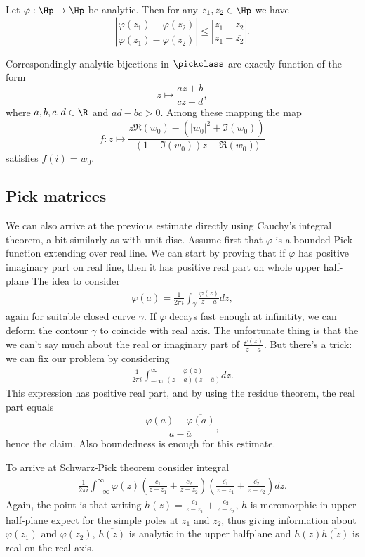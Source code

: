 \begin{lause}
	Let $\varphi : \Hp \to \Hp$ be analytic. Then for any $z_{1}, z_{2} \in \Hp$ we have
	\[
		\left|\frac{\varphi(z_{1}) - \varphi(z_{2})}{\varphi(z_{1}) - \overline{\varphi(z_{2})}} \right| \leq \left|\frac{z_{1} - z_{2}}{z_{1} - \overline{z_{2}}} \right|.
	\]
\end{lause}

Correspondingly analytic bijections in $\pickclass$ are exactly function of the form
\[
	z \mapsto \frac{a z + b}{c z + d},
\]
where $a, b, c, d \in \R$ and $a d - b c > 0$. Among these mapping the map
\[
	f : z \mapsto \frac{z \Re(w_{0}) - (|w_{0}|^2 + \Im(w_{0}))}{(1 + \Im(w_{0})) z - \Re(w_{0}))}
\]
satisfies $f(i) = w_{0}$.

\subsection{Pick matrices}

We can also arrive at the previous estimate directly using Cauchy's integral theorem, a bit similarly as with unit disc. Assume first that $\varphi$ is a bounded Pick-function extending over real line. We can start by proving that if $\varphi$ has positive imaginary part on real line, then it has positive real part on whole upper half-plane The idea to consider
\begin{align*}
	\varphi(a) = \frac{1}{2 \pi i}\int_{\gamma} \frac{\varphi(z)}{z - a} dz,
\end{align*}
again for suitable closed curve $\gamma$. If $\varphi$ decays fast enough at infinitity, we can deform the contour $\gamma$ to coincide with real axis. The unfortunate thing is that the we can't say much about the real or imaginary part of $ \frac{\varphi(z)}{z - a}$. But there's a trick: we can fix our problem by considering
\begin{align*}
	\frac{1}{2 \pi i}\int_{-\infty}^{\infty} \frac{\varphi(z)}{(z - a) (z - \overline{a})} dz.
\end{align*}
This expression has positive real part, and by using the residue theorem, the real part equals
\[
	\frac{\varphi(a) - \overline{\varphi(a)}}{a - \overline{a}},
\]
hence the claim. Also boundedness is enough for this estimate.

To arrive at Schwarz-Pick theorem consider integral
\begin{align*}
	\frac{1}{2 \pi i}\int_{-\infty}^{\infty} \varphi(z) \left(\frac{c_{1}}{z - z_{1}} + \frac{c_{2}}{z - z_{2}} \right) \left(\frac{\overline{c_{1}}}{z - \overline{z_{1}}} + \frac{\overline{c_{2}}}{z - \overline{z_{2}}} \right) dz.
\end{align*}
Again, the point is that writing $h(z) = \frac{c_{1}}{z - z_{1}} + \frac{c_{2}}{z - z_{2}}$, $h$ is meromorphic in upper half-plane expect for the simple poles at $z_{1}$ and $z_{2}$, thus giving information about $\varphi(z_{1})$ and $\varphi(z_{2})$, $\overline{h(\overline{z})}$ is analytic in the upper halfplane and $h(z)\overline{h(\overline{z})}$ is real on the real axis.

